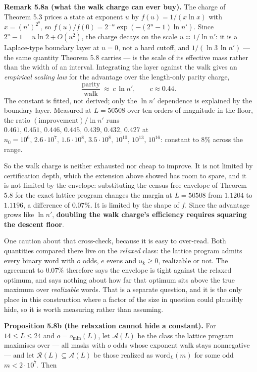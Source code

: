 \documentclass[12pt]{article}
\begin{document}
\textbf{Remark 5.8a (what the walk charge can ever buy).} The charge of
Theorem 5.3 prices a state at exponent \(u\) by \(f(u)=1/(x\ln x)\) with
\(x=(n')^{2^{u}}\), so \(f(u)/f(0)=2^{-u}\exp(-(2^{u}-1)\ln n')\). Since
\(2^{u}-1=u\ln2+O(u^{2})\), the charge decays on the scale
\(u\asymp1/\ln n'\): it is a Laplace-type boundary layer at \(u=0\), not
a hard cutoff, and \(1/(\ln3\,\ln n')\) --- the same quantity Theorem
5.8 carries --- is the scale of its effective mass rather than the width
of an interval. Integrating the layer against the walk gives an
\emph{empirical scaling law} for the advantage over the length-only
parity charge, \[
\frac{\text{parity}}{\text{walk}}\ \approx\ c\,\ln n',
\qquad c\approx0.44 .
\] The constant is fitted, not derived; only the \(\ln n'\) dependence
is explained by the boundary layer. Measured at \(L=50508\) over ten
orders of magnitude in the floor, the ratio
\((\text{improvement})/\ln n'\) runs
\(0.461,\,0.451,\,0.446,\,0.445,\,0.439,\,0.432,\,0.427\) at
\(n_0=10^{6},\,2.6\cdot10^{7},\,1.6\cdot10^{8},\,3.5\cdot10^{8},\,
10^{10},\,10^{13},\,10^{16}\): constant to \(8\%\) across the range.

So the walk charge is neither exhausted nor cheap to improve. It is not
limited by certification depth, which the extension above showed has
room to spare, and it is not limited by the envelope: substituting the
census-free envelope of Theorem 5.8 for the exact lattice program
changes the margin at \(L=50508\) from \(1.1204\) to \(1.1196\), a
difference of \(0.07\%\). It is limited by the shape of \(f\). Since the
advantage grows like \(\ln n'\), \textbf{doubling the walk charge's
efficiency requires squaring the descent floor}.

One caution about that cross-check, because it is easy to over-read.
Both quantities compared there live on the \emph{relaxed} class: the
lattice program admits every binary word with \(o\) odds, \(e\) evens
and \(u_k\ge0\), realizable or not. The agreement to \(0.07\%\)
therefore says the envelope is tight against the relaxed optimum, and
says nothing about how far that optimum sits above the true maximum over
\emph{realizable} words. That is a separate question, and it is the only
place in this construction where a factor of the size in question could
plausibly hide, so it is worth measuring rather than assuming.

\textbf{Proposition 5.8b (the relaxation cannot hide a constant).} For
\(14\le L\le24\) and \(o=o_{\min}(L)\), let \(\mathcal A(L)\) be the
class the lattice program maximises over --- all masks with \(o\) odds
whose exponent walk stays nonnegative --- and let
\(\mathcal R(L)\subseteq\mathcal A(L)\) be those realized as
\(\mathrm{word}_L(m)\) for some odd \(m<2\cdot10^{7}\). Then
\end{document}
